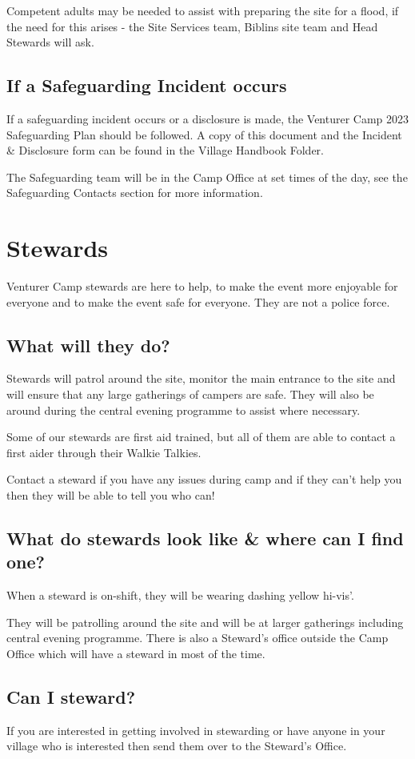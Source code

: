 \documentclass[a4paper, 11pt]{report}
\begin{document}
Competent adults may be needed to assist with preparing the site for a flood, if the need for this arises - the Site Services team, Biblins site team and Head Stewards will ask. 

\section{If a Safeguarding Incident occurs}
If a safeguarding incident occurs or a disclosure is made, the Venturer Camp 2023 Safeguarding Plan should be followed. A copy of this document and the Incident \& Disclosure form can be found in the Village Handbook Folder.\nl

The Safeguarding team will be in the Camp Office at set times of the day, see the Safeguarding Contacts section for more information.

\chapter{Stewards}
Venturer Camp stewards are here to help, to make the event more enjoyable for everyone and to make the event safe for everyone. They are not a police force.
\section{What will they do?}
Stewards will patrol around the site, monitor the main entrance to the site and will ensure that any large gatherings of campers are safe. They will also be around during the central evening programme to assist where necessary.\nl

Some of our stewards are first aid trained, but all of them are able to contact a first aider through their Walkie Talkies. \nl

Contact a steward if you have any issues during camp and if they can't help you then they will be able to tell you who can!

\section{What do stewards look like \& where can I find one?}
When a steward is on-shift, they will be wearing dashing yellow hi-vis'.\nl

They will be patrolling around the site and will be at larger gatherings including central evening programme.  There is also a Steward's office outside the Camp Office which will have a steward in most of the time. 

\section{Can I steward?}
If you are interested in getting involved in stewarding or have anyone in your village who is interested then send them over to the Steward's Office.\nl
\end{document}
